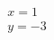 \documentclass{article}
\begin{document}
\begin{gather}
	  x = 1 \\
	  y = -3
\end{gather}
\end{document}
